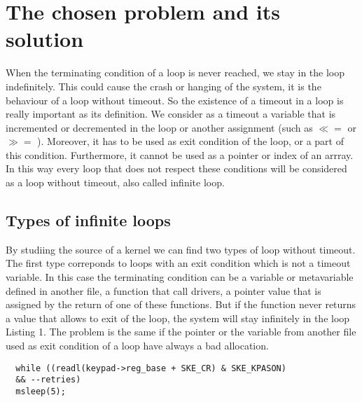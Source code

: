 \documentclass[a4paper,12pt]{article}
\begin{document}
\newpage

\section{The chosen problem and its solution}

When the terminating condition of a loop is never reached, we stay in the loop indefinitely. This could cause the crash or hanging of the system, it is the behaviour of a loop without timeout. So the existence of a timeout in a loop is really important as its definition. We consider as a timeout a variable that is incremented or decremented in the loop or another assignment (such as $ \ll= $ or $ \gg= $ ). Moreover, it has to be used as  exit condition of the loop, or a part of this condition. Furthermore, it cannot be used as a pointer or index of an arrray. In this way every loop that does not respect these conditions will be considered as a loop without timeout, also called infinite loop.


\subsection{Types of infinite loops}
By studiing the source of a kernel we can find two types of loop without timeout. The first type correponds to loops with an exit condition which is not a timeout variable. In this case the terminating condition can be a variable or metavariable defined in another file, a function that call drivers, a pointer value that is assigned by the return of one of these functions. But if the function never returns a value that allows to exit of the loop, the system will stay infinitely in the loop Listing 1. The problem is the same if the pointer or the variable from another file used as exit condition of a loop have always a bad allocation.

\begin{lstlisting}
  while ((readl(keypad->reg_base + SKE_CR) & SKE_KPASON) 
  && --retries)
  msleep(5);
\end{lstlisting}
\end{document}
